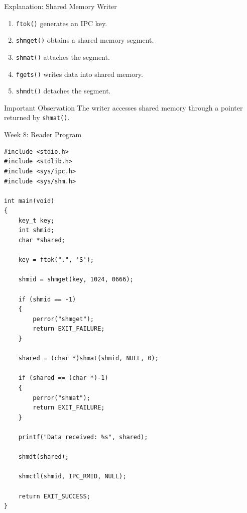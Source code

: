 \documentclass[aspectratio=169,10pt]{beamer}
\begin{document}
\begin{frame}{Explanation: Shared Memory Writer}

\begin{enumerate}
    \item \texttt{ftok()} generates an IPC key.
    \item \texttt{shmget()} obtains a shared memory segment.
    \item \texttt{shmat()} attaches the segment.
    \item \texttt{fgets()} writes data into shared memory.
    \item \texttt{shmdt()} detaches the segment.
\end{enumerate}

\begin{block}{Important Observation}
The writer accesses shared memory through
a pointer returned by \texttt{shmat()}.
\end{block}

\end{frame}

\begin{frame}[fragile]{Week 8: Reader Program}

\begin{lstlisting}[style=cstyle]
#include <stdio.h>
#include <stdlib.h>
#include <sys/ipc.h>
#include <sys/shm.h>

int main(void)
{
    key_t key;
    int shmid;
    char *shared;

    key = ftok(".", 'S');

    shmid = shmget(key, 1024, 0666);

    if (shmid == -1)
    {
        perror("shmget");
        return EXIT_FAILURE;
    }

    shared = (char *)shmat(shmid, NULL, 0);

    if (shared == (char *)-1)
    {
        perror("shmat");
        return EXIT_FAILURE;
    }

    printf("Data received: %s", shared);

    shmdt(shared);

    shmctl(shmid, IPC_RMID, NULL);

    return EXIT_SUCCESS;
}
\end{lstlisting}

\end{frame}
\end{document}
